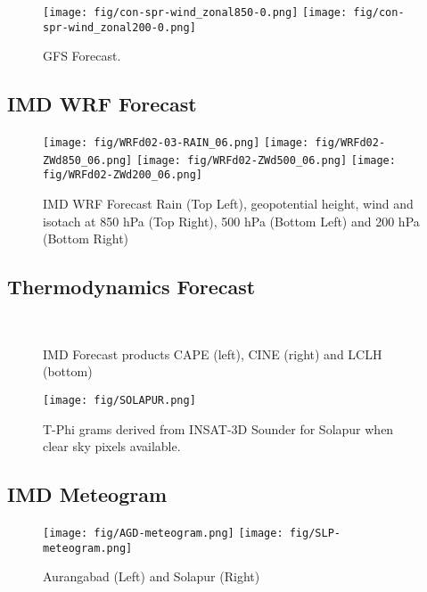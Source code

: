 \documentclass[10pt,usletter]{article} %
\begin{document}
\begin{figure}[H]
\centering
\texttt{[image: fig/con-spr-wind\_zonal850-0.png]}
\texttt{[image: fig/con-spr-wind\_zonal200-0.png]}
\caption{GFS Forecast.}
\end{figure}


\subsection*{IMD WRF Forecast}

\begin{figure}[H]
\centering
\texttt{[image: fig/WRFd02-03-RAIN\_06.png]}
\texttt{[image: fig/WRFd02-ZWd850\_06.png]}
\texttt{[image: fig/WRFd02-ZWd500\_06.png]}
\texttt{[image: fig/WRFd02-ZWd200\_06.png]}
\caption{IMD WRF Forecast Rain (Top Left), geopotential height, wind and isotach at 850 hPa (Top Right), 500 hPa (Bottom Left) and 200 hPa (Bottom Right)}
\end{figure}







\subsection*{Thermodynamics Forecast}%
\begin{figure}[H]
\centering
{} \hskip 0.1cm
%
\\
\vskip 0.1cm
\caption{IMD Forecast products CAPE (left), CINE (right) and  LCLH (bottom)}
\end{figure}


\begin{figure}[H]
\centering
\texttt{[image: fig/SOLAPUR.png]}\\
\caption{T-Phi grams derived from INSAT-3D Sounder for Solapur when clear sky pixels available.}
\end{figure}


\subsection*{IMD Meteogram}
\begin{figure}[H]
\centering
\texttt{[image: fig/AGD-meteogram.png]}
\texttt{[image: fig/SLP-meteogram.png]}
\caption{Aurangabad (Left) and Solapur (Right)}
\end{figure}
\end{document}
